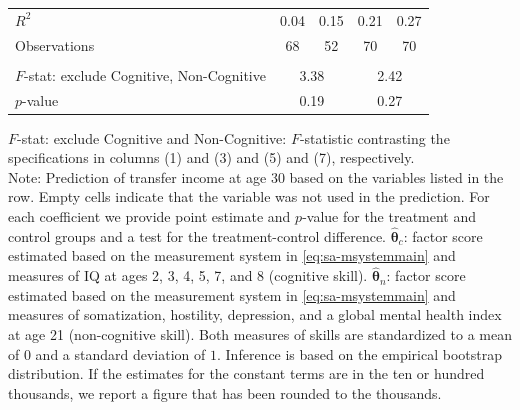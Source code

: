 \documentclass[static]{JJH-Beamer}
\begin{document}
\begin{frame}
\begin{table}[H]
\begin{center}
{\begin{tabular}{lcccccccc}
$R^2$ &          \multicolumn{2}{c}{0.04} &             \multicolumn{2}{c}{0.15} &            \multicolumn{2}{c}{0.21} &              \multicolumn{2}{c}{0.27}   \\
Observations &         \multicolumn{2}{c}{68} &                 \multicolumn{2}{c}{52} &               \multicolumn{2}{c}{70}  &                \multicolumn{2}{c}{70}   \\  \\
\midrule
$F$-stat: exclude Cognitive, Non-Cognitive  &                 \multicolumn{4}{c}{3.38} &              \multicolumn{4}{c}{2.42}  \\
$p$-value &                \multicolumn{4}{c}{0.19} &               \multicolumn{4}{c}{0.27}  \\
\bottomrule
\end{tabular}
}
\end{center}
\tiny \flushleft
$F$-stat: exclude Cognitive and Non-Cognitive: $F$-statistic contrasting the specifications in columns (1) and (3) and (5) and (7), respectively.\\
Note: Prediction of transfer income at age 30 based on the variables listed in the row. Empty cells indicate that the variable was not used in the prediction. For each coefficient we provide point estimate and $p$-value for the treatment and control groups and a test for the treatment-control difference. $\hat{\bm{\theta}}_{c}$: factor score estimated based on the measurement system in \eqref{eq:sa-msystemmain} and measures of IQ at ages 2, 3, 4, 5, 7, and 8 (cognitive skill). $\hat{\bm{\theta}}_{n}$: factor score estimated based on the measurement system in \eqref{eq:sa-msystemmain} and measures of somatization, hostility, depression, and a global mental health index at age 21 (non-cognitive skill). Both measures of skills are standardized to a mean of $0$ and a standard deviation of $1$. Inference is based on the empirical bootstrap distribution. If the estimates for the constant terms are in the ten or hundred thousands, we report a figure that has been rounded to the thousands.\\
\end{table}

\end{frame}
\end{document}

